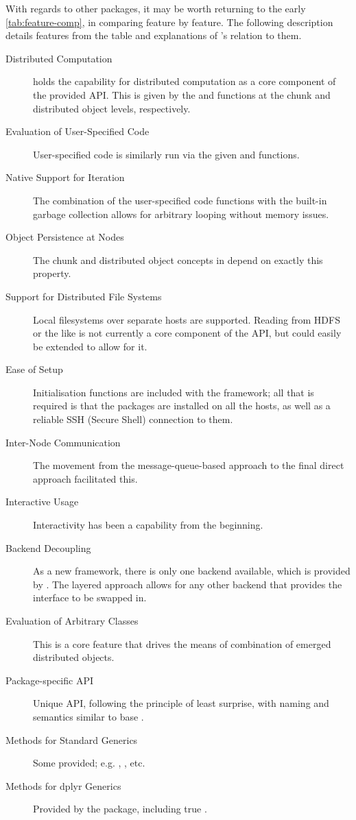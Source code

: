 With regards to other packages, it may be worth returning to the early \cref{tab:feature-comp}, in comparing feature by feature.
The following description details features from the table and explanations of \lsr{}'s relation to them.

\begin{description}
\item[Distributed Computation] \lsr{} holds the capability for distributed computation as a core component of the provided API. This is given by the  and  functions at the chunk and distributed object levels, respectively.
\item[Evaluation of User-Specified Code] User-specified code is similarly run via the given  and  functions.
\item[Native Support for Iteration] The combination of the user-specified code functions with the built-in garbage collection allows for arbitrary looping without memory issues.
\item[Object Persistence at Nodes] The chunk and distributed object concepts in \lsr{} depend on exactly this property.
\item[Support for Distributed File Systems] Local filesystems over separate hosts are supported. Reading from HDFS or the like is not currently a core component of the API, but could easily be extended to allow for it.
\item[Ease of Setup] Initialisation functions are included with the framework; all that is required is that the \lsr{} packages are installed on all the hosts, as well as a reliable SSH (Secure Shell) connection to them.
\item[Inter-Node Communication] The movement from the message-queue-based approach to the final direct approach facilitated this.
\item[Interactive Usage] Interactivity has been a capability from the beginning.
\item[Backend Decoupling] As a new framework, there is only one backend available, which is provided by \orcv{}. The layered approach allows for any other backend that provides the \orcv{} interface to be swapped in.
\item[Evaluation of Arbitrary Classes] This is a core feature that drives the means of combination of emerged distributed objects.
\item[Package-specific API] Unique API, following the principle of least surprise, with naming and semantics similar to base \R{}.
\item[Methods for Standard Generics] Some provided; e.g. , , etc.
\item[Methods for dplyr Generics] Provided by the \lso{} package, including true .
\end{description}


